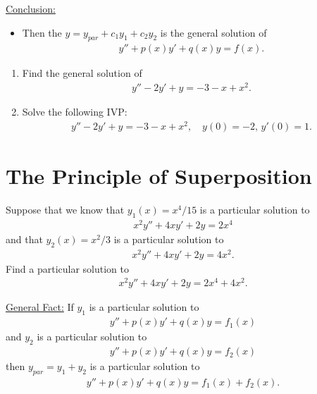 \documentclass[12pt,a4paper]{article}
\newcounter{example}[section]
\begin{document}
\underline{Conclusion:}
	\begin{itemize}
	\item Then the $y = y_{par} + c_1 y_1 + c_2 y_2$ is the general solution of
		\begin{align*}
		y'' + p(x) y' + q(x) y = f(x) .
		\end{align*}
	\end{itemize}
	
	\vspace*{16pt}

	\begin{example}
	\begin{enumerate}[label=\alph*)]
	\item Find the general solution of
		\begin{align*}
		y'' - 2y' + y = -3 - x + x^2 .
		\end{align*}
	\item Solve the following IVP:
		\begin{align*}
		y'' - 2y' + y = -3 - x + x^2 , \quad y(0) = -2 , \, y'(0) = 1 .
		\end{align*}
	\end{enumerate}
	\end{example}
	
	\newpage
	
	\phantom{2}
	
	\newpage
	
	\section{The Principle of Superposition}
		
	\begin{example}
	Suppose that we know that $y_1 (x) = x^4/15$ is a particular solution to
		\begin{align*}
		x^2 y'' + 4xy' + 2y = 2x^4
		\end{align*}
	and that $y_2 (x) = x^2/3$ is a particular solution to
		\begin{align*}
		x^2 y'' + 4xy' + 2y = 4x^2 .
		\end{align*}
	Find a particular solution to
		\begin{align*}
		x^2 y'' + 4xy' + 2y = 2x^4 + 4x^2 .
		\end{align*}
	\end{example}
	
	\newpage
	
	\underline{General Fact:}
	If $y_1$ is a particular solution to
		\begin{align*}
		y'' + p (x) y' + q (x) y = f_1 (x)
		\end{align*}
	and $y_2$ is a particular solution to
		\begin{align*}
		y'' + p (x) y' + q (x) y = f _2(x)
		\end{align*}
	then $y_{par} = y_1 + y_2$ is a particular solution to
		\begin{align*}
		y'' + p(x) y' + q(x) y = f_1 (x) + f_2 (x) .
		\end{align*}
\end{document}
